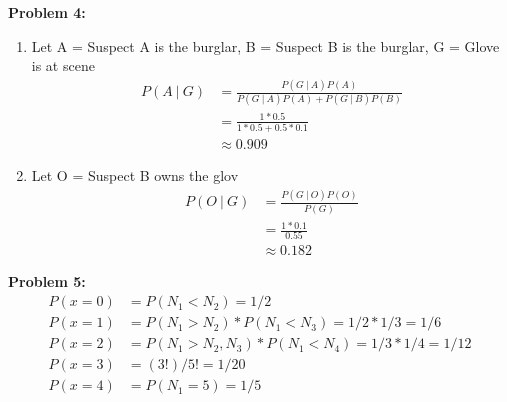 \documentclass[12pt]{article}
\begin{document}
\noindent \textbf{Problem 4:}



\begin{enumerate}
      \item[(a)] Let A = Suspect A is the burglar, B = Suspect B is the burglar, G = Glove is at scene
            \begin{align*}
                  P(A~|~G) & = \frac{P(G~|~A)P(A)}{P(G~|~A)P(A) + P(G~|~B)P(B)} \\
                           & = \frac{1 * 0.5}{1 * 0.5 + 0.5 * 0.1}              \\
                           & \approx{0.909}
            \end{align*}
      \item[(b)] Let O = Suspect B owns the glov
            \begin{align*}
                  P(O ~|~ G) & = \frac{P(G ~|~ O)P(O)}{P(G)} \\
                             & = \frac{1 * 0.1}{0.55}        \\
                             & \approx{0.182}
            \end{align*}

\end{enumerate}

\noindent \textbf{Problem 5:}
\begin{align*}
      P(x=0) & = P(N_1 < N_2) = 1/2                                   \\
      P(x=1) & = P(N_1 > N_2) * P(N_1 < N_3) = 1/2 * 1/3 = 1/6        \\
      P(x=2) & = P(N_1 > N_2, N_3) * P(N_1 < N_4) = 1/3 * 1/4 =  1/12 \\
      P(x=3) & = (3!)/5! = 1/20                                       \\
      P(x=4) & = P(N_1 = 5) =  1/5
\end{align*}
\end{document}
